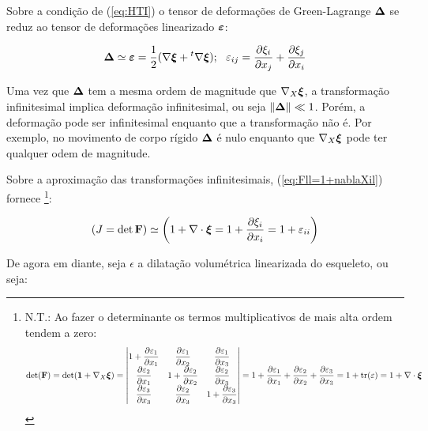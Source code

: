 \documentclass[
	11pt, %
	fleqn, %
	a4paper, %
]{LegrandOrangeBook}
\begin{document}
Sobre a condição de (\ref{eq:HTI}) o tensor de deformações de Green-Lagrange $\bm{\Delta}$ se reduz ao tensor de deformações linearizado $\bm{\varepsilon}$: 

\begin{equation}
	\label{eq:strainll}
\bm{\Delta} \simeq \bm{\varepsilon} = \dfrac{1}{2}(\nabla \bm{\xi} + {}^t\nabla \bm{\xi}); ~~ \varepsilon_{ij} =  \dfrac{\partial \xi_i}{\partial x_j} + \dfrac{\partial \xi_j}{\partial x_i}
\end{equation}

Uma vez que $\bm{\Delta}$ tem a mesma ordem de magnitude que $\nabla_X\bm{\xi}$, a transformação infinitesimal implica deformação infinitesimal, ou seja $\|\bm{\Delta}\| \ll 1$. Porém, a deformação pode ser infinitesimal enquanto que a transformação não é. Por exemplo, no movimento de corpo rígido $\bm{\Delta}$ é nulo enquanto que $\nabla_X \bm{\xi}$ pode ter qualquer odem de magnitude.

Sobre a aproximação das transformações infinitesimais, (\ref{eq:Fll=1+nablaXil}) fornece \footnote{N.T.: Ao fazer o determinante os termos multiplicativos de mais alta ordem tendem a zero:
\begin{displaymath}		
\det(\textbf{F}) = \det (\bm{1} + \nabla_X \bm{\xi}) = \begin{vmatrix}
	1+\dfrac{\partial \varepsilon_1}{\partial x_1} & \dfrac{\partial \varepsilon_1}{\partial x_2} & \dfrac{\partial \varepsilon_1}{\partial x_3} \\
	\dfrac{\partial \varepsilon_2}{\partial x_1} & 1 + \dfrac{\partial \varepsilon_2}{\partial x_2} & \dfrac{\partial \varepsilon_2}{\partial x_3} \\
	\dfrac{\partial \varepsilon_3}{\partial x_3} & \dfrac{\partial \varepsilon_2}{\partial x_3} & 1+ \dfrac{\partial \varepsilon_3}{\partial x_3}
\end{vmatrix} = 1 + \dfrac{\partial \varepsilon_1}{\partial x_1} + \dfrac{\partial \varepsilon_2}{\partial x_2} + \dfrac{\partial \varepsilon_3}{\partial x_3} = 1 + \text{tr}(\varepsilon) = 1 + \nabla \cdot \bm{\xi}
\end{displaymath}	}:

\begin{equation}
	\label{eq:J}	
	\left(J = \det \textbf{F}\right) \simeq \left(1+\nabla \cdot \bm{\xi} = 1 + \dfrac{\partial \xi_i}{\partial x_i} = 1 + \varepsilon_{ii}\right)
\end{equation}

De agora em diante, seja $\epsilon$ a dilatação volumétrica linearizada do esqueleto, ou seja:
\end{document}
